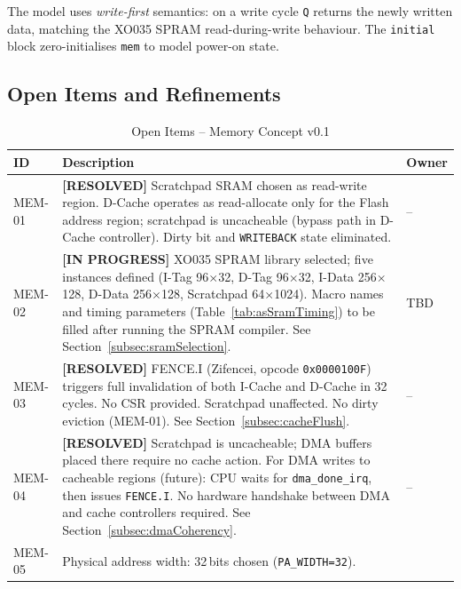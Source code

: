 The model uses \emph{write-first} semantics: on a write cycle
\texttt{Q} returns the newly written data, matching the XO035 SPRAM
read-during-write behaviour.
The \texttt{initial} block zero-initialises \texttt{mem} to
model power-on state.

\subsection{Open Items and Refinements}

\begin{table}[H]
\caption{Open Items -- Memory Concept v0.1}
\label{tab:asMemOpenItems}
\centering
\begin{tabularx}{\textwidth}{|l |X |l|}
  \hline
  ID & Description & Owner \\
  \hline
  \hline
  MEM-01 & \textbf{[RESOLVED]} Scratchpad SRAM chosen as read-write region.
           D-Cache operates as read-allocate only for the Flash address region;
           scratchpad is uncacheable (bypass path in D-Cache controller).
           Dirty bit and \texttt{WRITEBACK} state eliminated. & -- \\
  \hline
  MEM-02 & \textbf{[IN PROGRESS]} XO035 SPRAM library selected; five instances
           defined (I-Tag 96$\times$32, D-Tag 96$\times$32, I-Data 256$\times$128,
           D-Data 256$\times$128, Scratchpad 64$\times$1024).
           Macro names and timing parameters (Table~\ref{tab:asSramTiming})
           to be filled after running the SPRAM compiler.
           See Section~\ref{subsec:sramSelection}. & TBD \\
  \hline
  MEM-03 & \textbf{[RESOLVED]} FENCE.I (Zifencei, opcode \texttt{0x0000100F})
           triggers full invalidation of both I-Cache and D-Cache in 32 cycles.
           No CSR provided. Scratchpad unaffected. No dirty eviction (MEM-01).
           See Section~\ref{subsec:cacheFlush}. & -- \\
  \hline
  MEM-04 & \textbf{[RESOLVED]} Scratchpad is uncacheable; DMA buffers placed
           there require no cache action.
           For DMA writes to cacheable regions (future): CPU waits for
           \texttt{dma\_done\_irq}, then issues \texttt{FENCE.I}.
           No hardware handshake between DMA and cache controllers required.
           See Section~\ref{subsec:dmaCoherency}. & -- \\
  \hline
  MEM-05 & Physical address width: 32\,bits chosen (\texttt{PA\_WIDTH=32}).

\end{tabularx}
\end{table}
